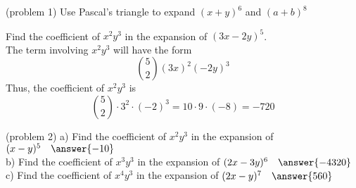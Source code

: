 \documentclass[handout]{ximera}
\begin{document}
\begin{problem}(problem 1)
Use Pascal's triangle to expand $(x+y)^6$ and $(a+b)^8$
\end{problem}

\begin{example}[example 2]
Find the coefficient of $x^2y^3$ in the expansion of $(3x-2y)^5$.\\
The term involving $x^2y^3$ will have the form
\[
\binom{5}{2}(3x)^2(-2y)^3
\]
Thus, the coefficient of $x^2y^3$ is
\[
\binom{5}{2}\cdot 3^2 \cdot (-2)^3 = 10\cdot 9 \cdot (-8) = -720
\]
\end{example}

\begin{problem}(problem 2)
a) Find the coefficient of $x^2y^3$ in the expansion of $(x-y)^5 \quad \answer{-10}$\\
b) Find the coefficient of $x^3y^3$ in the expansion of $(2x-3y)^6 \quad \answer{-4320}$\\
c) Find the coefficient of $x^4y^3$ in the expansion of $(2x-y)^7 \quad \answer{560}$\\
\end{problem}


\end{document}
